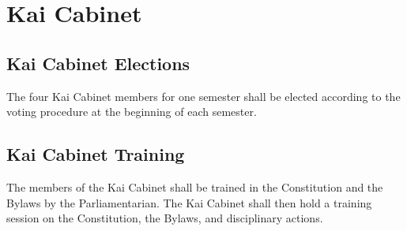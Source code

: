 \chapter{Kai Cabinet}
\label{cha:kai-cabinet}

\section{Kai Cabinet Elections}
\label{sec:kai-cabinet-elections}

The four Kai Cabinet members for one semester shall be elected according to the
voting procedure at the beginning of each semester.

\section{Kai Cabinet Training}
\label{sec:kai-cabinet-training}

The members of the Kai Cabinet shall be trained in the Constitution and the
Bylaws by the Parliamentarian.
The Kai Cabinet shall then hold a training session on the Constitution, the
Bylaws, and disciplinary actions.

